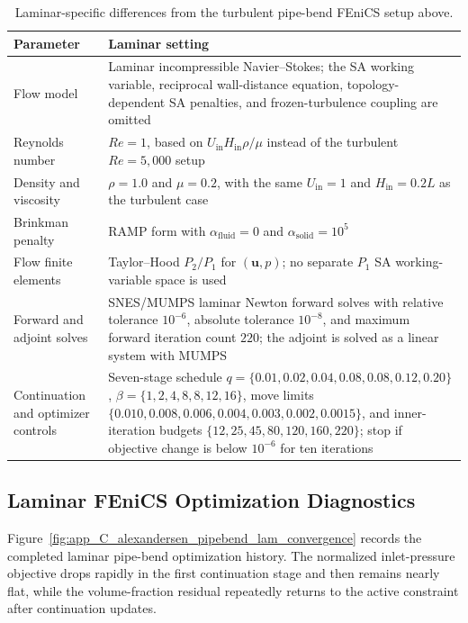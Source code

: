 \begin{table}[htbp]
	\centering
	\footnotesize
	\caption{Laminar-specific differences from the turbulent pipe-bend FEniCS setup above.}
	\label{tab:app_C_alexandersen_pipebend_lam_differences}
	\renewcommand{\arraystretch}{1.2}
	\begin{tabularx}{\textwidth}{l X}
		\hline
		\textbf{Parameter} & \textbf{Laminar setting} \\
		\hline
			Flow model & Laminar incompressible Navier--Stokes; the SA working variable, reciprocal wall-distance equation, topology-dependent SA penalties, and frozen-turbulence coupling are omitted \\
			Reynolds number & $Re=1$, based on $U_{\mathrm{in}}H_{\mathrm{in}}\rho/\mu$ instead of the turbulent $Re=5{,}000$ setup \\
			Density and viscosity & $\rho=1.0$ and $\mu=0.2$, with the same $U_{\mathrm{in}}=1$ and $H_{\mathrm{in}}=0.2L$ as the turbulent case \\
			Brinkman penalty & RAMP form with $\alpha_{\mathrm{fluid}}=0$ and $\alpha_{\mathrm{solid}}=10^5$ \\
			Flow finite elements & Taylor--Hood $P_2/P_1$ for $(\mathbf{u},p)$; no separate $P_1$ SA working-variable space is used \\
			Forward and adjoint solves & SNES/MUMPS laminar Newton forward solves with relative tolerance $10^{-6}$, absolute tolerance $10^{-8}$, and maximum forward iteration count $220$; the adjoint is solved as a linear system with MUMPS \\
			Continuation and optimizer controls & Seven-stage schedule $q=\{0.01,0.02,0.04,0.08,0.08,0.12,0.20\}$, $\beta=\{1,2,4,8,8,12,16\}$, move limits $\{0.010,0.008,0.006,0.004,0.003,0.002,0.0015\}$, and inner-iteration budgets $\{12,25,45,80,120,160,220\}$; stop if objective change is below $10^{-6}$ for ten iterations \\
		\hline
	\end{tabularx}
\end{table}

\subsection{Laminar FEniCS Optimization Diagnostics}
\label{subsec:app_C_alexandersen_pipebend_lam_diagnostics}
Figure~\ref{fig:app_C_alexandersen_pipebend_lam_convergence} records the completed laminar pipe-bend optimization history. The normalized inlet-pressure objective drops rapidly in the first continuation stage and then remains nearly flat, while the volume-fraction residual repeatedly returns to the active constraint after continuation updates.

